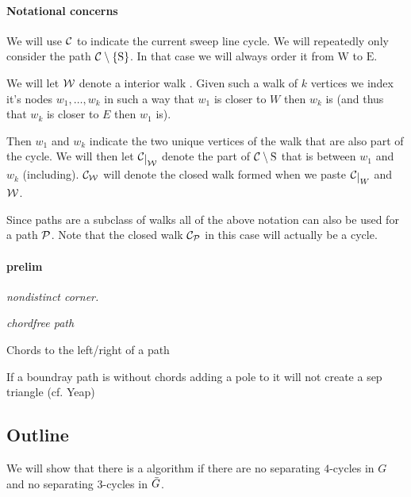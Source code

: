 



\maketitle

\newcommand{\mrN}{\mathrm{N}}
\newcommand{\mrS}{\mathrm{S}}
\newcommand{\mrE}{\mathrm{E}}
\newcommand{\mrW}{\mathrm{W}}


\paragraph{Notational concerns}
We will use $\C$ to indicate the current sweep line cycle. 
We will repeatedly only consider the path $\cpath$. In that case we will always order it from $\mrW$ to $\mrE$. 

We will let $\W$ denote a interior walk  . Given such a walk of $k$ vertices we index it's nodes $w_1, \ldots, w_k$  in such a way that $w_1$ is closer to $W$ then $w_k$ is (and thus that $w_k$ is closer to $E$ then $w_1$ is). 

Then $w_1$ and $w_k$ indicate the two unique vertices of the walk that are also part of the cycle. We will then let $\restC{\W}$ denote the part of $\C\setminus {\mathrm{S}}$ that is between $w_1$ and $w_k$ (including). $\C_\W$ will denote the closed walk formed when we paste $\restC{W}$ and $\W$.

Since paths are a subclass of walks all of the above notation can also be used for a path $\P$. Note that the closed walk $\C_\P$ in this case will actually be a cycle.


\paragraph{prelim}
\emph{nondistinct corner.}

\emph{chordfree path}

Chords to the left/right of a path

\begin{lemma}
If a boundray path is without chords adding a pole to it will not create a sep triangle (cf. Yeap)
\end{lemma}

\subsection{Outline}
We will show that there is a algorithm if there are no separating $4$-cycles in $G$ and no separating $3$-cycles in $\ext G$.

